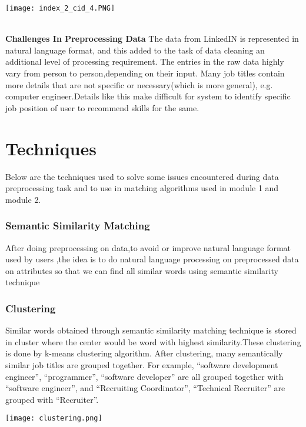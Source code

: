 \documentclass[journal]{IEEEtran}
\begin{document}
    \begin{center}
        \texttt{[image: index\_2\_cid\_4.PNG]}
        \\\caption\textit{{Fig 2.Output of data prepocessing module\\ Choosing a file index = 2 and candidate id = 4}}
    \end{center}
        
    \\\textbf{Challenges In Preprocessing Data}  
    The data from LinkedIN is represented in natural language format, and this added to the task of data cleaning an additional level of processing requirement. The entries in the raw data highly vary from person to person,depending on their input. Many job titles contain more details that are not specific or necessary(which is more general), e.g.
    computer engineer.Details like this make difficult for system to identify specific job position of user to recommend skills for the same.
    
\section{Techniques}
    
    Below are the techniques used to solve some issues encountered during  data preprocessing task and to use in matching algorithms used in module 1 and module 2.
    \subsubsection{\textbf{Semantic Similarity Matching}}
        After doing preprocessing on data,to avoid or improve natural language format used by users ,the idea is to do natural language processing on preprocessed data on attributes so that we can find all similar words using semantic similarity technique  
    
    \subsubsection{\textbf{Clustering}}
       Similar words obtained through semantic similarity matching technique is stored in cluster where the center would be word with highest similarity.These clustering is done by k-means clustering algorithm.
       After clustering, many semantically similar job titles are grouped together. For example, “software development engineer”, “programmer”, “software developer” are all grouped together with “software engineer”, and “Recruiting Coordinator”, “Technical Recruiter” are grouped with “Recruiter”.
        \begin{center}
            \texttt{[image: clustering.png]}
            \\\caption\textit{{Fig 3.Clustering semantically similar words}}
        \end{center}
   
\end{document}
